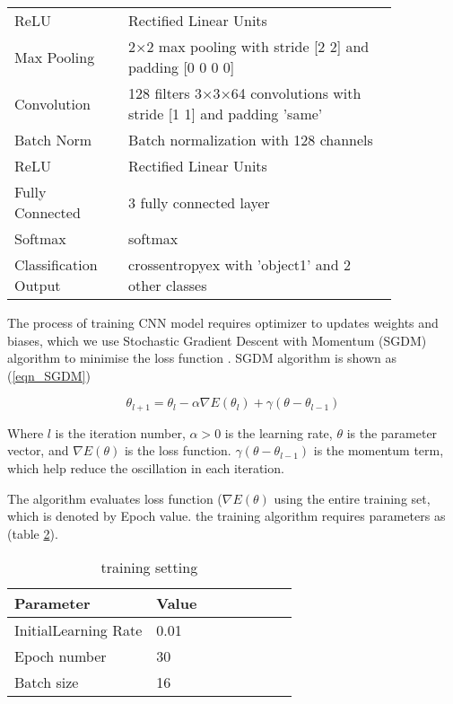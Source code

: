 \documentclass[conference]{IEEEtran}
\begin{document}
\begin{table}[!htbp]
\begin{tabularx}{0.48\textwidth}{p{0.25\linewidth} | p{0.6\linewidth}}
ReLU                    & Rectified Linear Units  \\
Max Pooling             & 2×2 max pooling with stride [2  2] and padding [0  0  0  0] \\
\hline
Convolution             & 128 filters 3×3×64 convolutions with stride [1  1] and padding 'same' \\
Batch Norm     & Batch normalization with 128 channels \\
ReLU                    & Rectified Linear Units  \\
\hline
Fully Connected         & 3 fully connected layer \\
Softmax                 & softmax \\
Classification Output   & crossentropyex with 'object1' and 2 other classes \\
\hline
\end{tabularx}%
\label{table_CNN}
\end{table}

The process of training CNN model requires optimizer to updates weights and biases, which we use Stochastic Gradient Descent with Momentum (SGDM) algorithm to minimise the loss function \cite{b7}. SGDM algorithm is shown as (\ref{eqn_SGDM})

\begin{equation}
\theta_{l+1} = \theta_l - \alpha\nabla E(\theta_l) + \gamma(\theta - \theta_{l-1}) 
\label{eqn_SGDM}
\end{equation}

Where $l$ is the iteration number, $\alpha > 0$ is the learning rate, $\theta $ is the parameter vector, and $\nabla E(\theta)$ is the loss function. $\gamma(\theta - \theta_{l-1})$ is the momentum term, which help reduce the oscillation in each iteration.

The algorithm evaluates loss function ($\nabla E(\theta)$ using the entire training set, which is denoted by Epoch value. the training algorithm requires parameters as (table \ref{table_trainingOpt}).


\begin{table}[!htbp]
\centering
\caption{training setting}
\begin{tabularx}{0.48\textwidth}{p{0.5\linewidth} | p{0.5\linewidth}}
\hline
Parameter & Value \\
\hline
InitialLearning Rate & 0.01 \\
Epoch number & 30 \\
Batch size & 16 \\
\hline


\end{tabularx}%
\label{table_trainingOpt}
\end{table}
\end{document}
